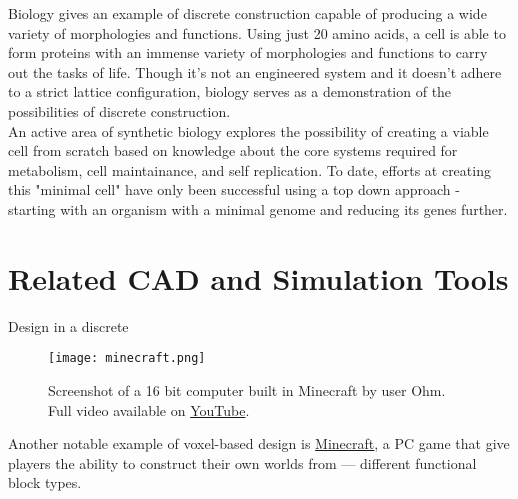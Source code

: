 {Biology gives an example of discrete construction capable of producing a wide variety of morphologies and functions.  Using just 20 amino acids, a cell is able to form proteins with an immense variety of morphologies and functions to carry out the tasks of life.  Though it's not an engineered system and it doesn't adhere to a strict lattice configuration, biology serves as a demonstration of the possibilities of discrete construction.
\\

An active area of synthetic biology explores the possibility of creating a viable cell from scratch based on knowledge about the core systems required for metabolism, cell maintainance, and self replication\cite{Forster2006}.  To date, efforts at creating this "minimal cell" have only been successful using a top down approach - starting with an organism with a minimal genome and reducing its genes further\cite{Glass2006}\cite{Gibson2010}.

\section{Related CAD and Simulation Tools}

Design in a discrete 




\begin{figure}
  \texttt{[image: minecraft.png]}
  \caption{Screenshot of a 16 bit computer built in Minecraft by user Ohm.  Full video available on \href{https://www.youtube.com/watch?v=KzrFzkb3A4o}{YouTube}.}
  \label{fig:minecraft}
\end{figure}
Another notable example of voxel-based design is \href{https://minecraft.net/}{Minecraft}, a PC game that give players the ability to construct their own worlds from --- different functional block types.
\\

}
